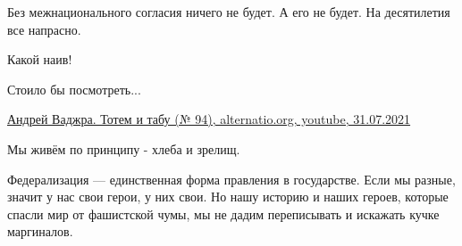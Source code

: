 Без межнационального согласия ничего не будет. А его не будет. На десятилетия все напрасно.

 
Какой наив!

 
Стоило бы посмотреть...

\href{https://www.youtube.com/watch?v=DCLwhq-SkMc}{%
Андрей Ваджра. Тотем и табу (№ 94), %
alternatio.org, youtube, 31.07.2021%
}

 
Мы живём по принципу - хлеба и зрелищ.

 
Федерализация — единственная форма правления в государстве. Если мы разные,
значит у нас свои герои, у них свои. Но нашу историю и наших героев, которые
спасли мир от фашистской чумы, мы не дадим переписывать и искажать кучке
маргиналов.

